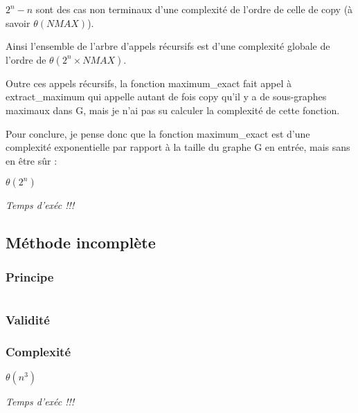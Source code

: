 $2^n-n$ sont des cas non terminaux d'une complexité de l'ordre de celle de copy (à savoir $\theta(NMAX)$).

Ainsi l'ensemble de l'arbre d'appels récursifs est d'une complexité globale de l'ordre de $\theta(2^n \times NMAX)$. 

Outre  ces appels récursifs, la fonction maximum\_exact fait appel à extract\_maximum qui appelle autant de fois copy qu'il y a de sous-graphes maximaux dans G, mais je n'ai pas su calculer la complexité de cette fonction.

Pour conclure, je pense donc que la fonction maximum\_exact est d'une complexité exponentielle par rapport à la taille du graphe G en entrée, mais sans en être sûr :

$\theta(2^n)$

\emph{Temps d'exéc !!!} 

\subsection{Méthode incomplète}

\subsubsection{Principe}

\begin{verbatim}

\end{verbatim}


\subsubsection{Validité}


\subsubsection{Complexité}
$\theta(n^3)$

\emph{Temps d'exéc !!!} 